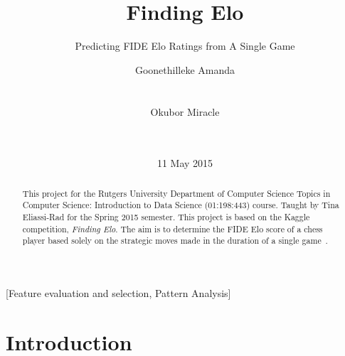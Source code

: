 \documentclass{acm_proc_article-sp}
\begin{document}
\title{Finding Elo}
\subtitle{Predicting FIDE Elo Ratings from A Single Game}

\date{11 May 2015}

\author{
\alignauthor
Goonethilleke Amanda\\
       \\
       \\
\alignauthor
Okubor Miracle\\
        \\
       \\
}



\maketitle
\begin{abstract}
This project for the Rutgers University Department of Computer Science Topics in Computer Science: Introduction to Data Science (01:198:443) course. Taught by Tina Eliassi-Rad for the Spring 2015 semester. This project is based on the Kaggle competition, \textit{Finding Elo}. The aim is to determine the FIDE Elo score of a chess player based solely on the strategic moves made in the duration of a single game~\cite{Kaggle}. %
\end{abstract}

[Feature evaluation and selection, Pattern Analysis]



\section{Introduction}
\end{document}
